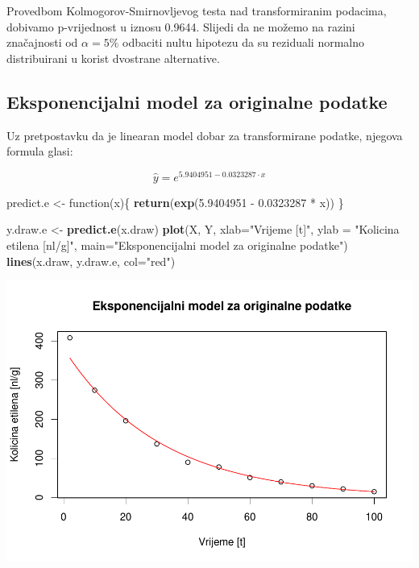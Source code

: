 \documentclass[]{article}
\newenvironment{Shaded}{\begin{snugshade}}{\end{snugshade}}
\newcommand{\KeywordTok}[1]{\textcolor[rgb]{0.13,0.29,0.53}{\textbf{{#1}}}}
\newcommand{\DataTypeTok}[1]{\textcolor[rgb]{0.13,0.29,0.53}{{#1}}}
\newcommand{\FloatTok}[1]{\textcolor[rgb]{0.00,0.00,0.81}{{#1}}}
\newcommand{\StringTok}[1]{\textcolor[rgb]{0.31,0.60,0.02}{{#1}}}
\newcommand{\NormalTok}[1]{{#1}}
\begin{document}
Provedbom Kolmogorov-Smirnovljevog testa nad transformiranim podacima,
dobivamo p-vrijednost u iznosu 0.9644. Slijedi da ne možemo na razini
značajnosti od \(\alpha=5\%\) odbaciti nultu hipotezu da su reziduali
normalno distribuirani u korist dvostrane alternative.

\subsection{Eksponencijalni model za originalne
podatke}\label{eksponencijalni-model-za-originalne-podatke}

Uz pretpostavku da je linearan model dobar za transformirane podatke,
njegova formula glasi:

\[\hat{y} = e^{5.9404951 - 0.0323287 \cdot x} \]

\begin{Shaded}
\begin{Highlighting}[]
\NormalTok{predict.e <-}\StringTok{ }\NormalTok{function(x)\{}
  \KeywordTok{return}\NormalTok{(}\KeywordTok{exp}\NormalTok{(}\FloatTok{5.9404951} \NormalTok{-}\StringTok{ }\FloatTok{0.0323287} \NormalTok{*}\StringTok{ }\NormalTok{x))}
\NormalTok{\}}

\NormalTok{y.draw.e <-}\StringTok{ }\KeywordTok{predict.e}\NormalTok{(x.draw)}
\KeywordTok{plot}\NormalTok{(X, Y,}
     \DataTypeTok{xlab=}\StringTok{"Vrijeme [t]"}\NormalTok{, }\DataTypeTok{ylab =} \StringTok{"Kolicina etilena [nl/g]"}\NormalTok{,}
     \DataTypeTok{main=}\StringTok{"Eksponencijalni model za originalne podatke"}\NormalTok{)}
\KeywordTok{lines}\NormalTok{(x.draw, y.draw.e, }\DataTypeTok{col=}\StringTok{"red"}\NormalTok{)}
\end{Highlighting}
\end{Shaded}

\includegraphics{Izvjestaj_files/figure-latex/unnamed-chunk-14-1.pdf}
\end{document}
